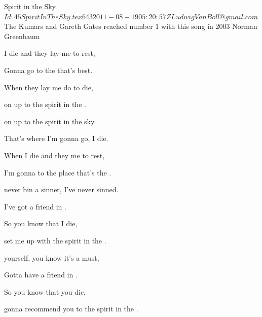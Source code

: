 \begin{SBSong}{Spirit in the Sky}
  {$Id: 45SpiritInTheSky.tex 643 2011-08-19 05:20:57Z LudwigVanBoll@gmail.com $}
  {The Kumars and Gareth Gates reached number 1 with this song in 2003}
  {Norman Greenbaum}
  \begin{SBVerse}
     I die and they lay me to rest,
    
    Gonna go to the  that's best.
    
    When they lay me do to die,
    
     on up to the spirit in the .
  \end{SBVerse}
  \begin{SBChorus}
     on up to the spirit in the sky.
    
    That's where I'm gonna go,  I die.
    
    When I die and they  me to rest,
    
    I'm gonna  to the place that's the .
  \end{SBChorus}
  \begin{SBVerse}
     never bin a sinner, I've never sinned.
    
    I've got a friend in .
    
    So you know that  I die,
    
     set me up with the spirit in the .
  \end{SBVerse}
  \begin{SBVerse}
     yourself, you know it's a must,
    
    Gotta have a friend in .
    
    So you know that  you die,
    
     gonna recommend you to the spirit in the .
  \end{SBVerse}
\end{SBSong}
